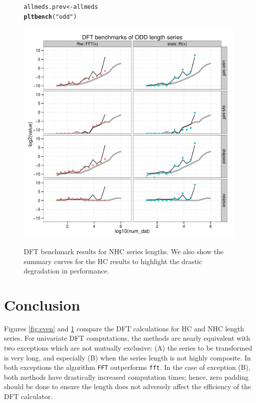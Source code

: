 \documentclass[12pt]{article}\usepackage{graphicx, color}
\makeatletter
\newcommand{\hlfunctioncall}[1]{\textcolor[rgb]{0.501960784313725,0,0.329411764705882}{\textbf{#1}}}%
\newcommand{\hlstring}[1]{\textcolor[rgb]{0.6,0.6,1}{#1}}%
\newenvironment{kframe}{%
 \def\at@end@of@kframe{}%
 \ifinner\ifhmode%
  \def\at@end@of@kframe{\end{minipage}}%
  \begin{minipage}{\columnwidth}%
 \fi\fi%
 \def\FrameCommand##1{\hskip\@totalleftmargin \hskip-\fboxsep
 \colorbox{shadecolor}{##1}\hskip-\fboxsep
     \hskip-\linewidth \hskip-\@totalleftmargin \hskip\columnwidth}%
 \MakeFramed {\advance\hsize-\width
   \@totalleftmargin\z@ \linewidth\hsize
   \@setminipage}}%
 {\par\unskip\endMakeFramed%
 \at@end@of@kframe}
\newenvironment{knitrout}{}{} %
\newcommand{\Rcmd}[1]{\texttt{#1}}
\makeatother
\begin{document}
\begin{figure}[htb!]
\begin{center}
\begin{knitrout}
\color{fgcolor}\begin{kframe}
\begin{alltt}
allmeds.prev <- allmeds
\hlfunctioncall{pltbench}(\hlstring{"odd"})
\end{alltt}
\end{kframe}
\end{knitrout}

\includegraphics[width=\textwidth]{fftw_bench_odd}
\label{fig:odd}
\caption{DFT benchmark results for NHC series lengths.
We also show the summary curves for the HC results
to highlight the drastic degradation in performance.}
\end{center}
\end{figure}

\section{Conclusion}

Figures \ref{fig:even} and \ref{fig:odd} compare the DFT
calculations for HC and NHC length series.
For univariate DFT computations,
the methods are nearly equivalent with two exceptions which
are not mutually exclusive: 
(A) the series to be transformed is very long, and 
especially (B) when the series length is not highly composite.
In both exceptions the algorithm \Rcmd{FFT} outperforms \Rcmd{fft}.
In the case of exception (B), both methods have
drastically increased computation times; hence, zero padding should be
done to ensure the length does not adversely
affect the efficiency of the DFT calculator.




\printindex
\end{document}
